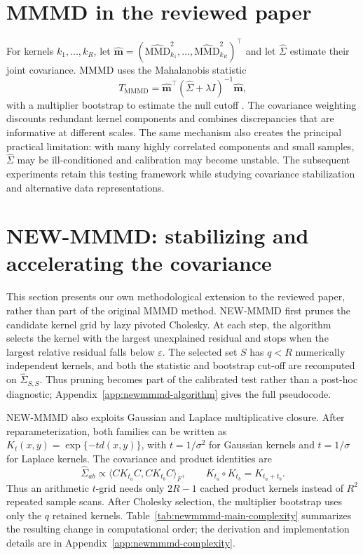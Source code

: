 \documentclass[12pt]{article}
\begin{document}
\section{MMMD in the reviewed paper}
For kernels $k_1,\ldots,k_R$, let $\widehat{\boldsymbol m}=(\widehat{\mathrm{MMD}}^2_{k_1},\ldots,\widehat{\mathrm{MMD}}^2_{k_R})^\top$ and let $\widehat\Sigma$ estimate their joint covariance. MMMD uses the Mahalanobis statistic
\[
T_{\mathrm{MMMD}}=\widehat{\boldsymbol m}^{\top}(\widehat\Sigma+\lambda I)^{-1}\widehat{\boldsymbol m},
\]
with a multiplier bootstrap to estimate the null cutoff \cite{chatterjee2025}. The covariance weighting discounts redundant kernel components and combines discrepancies that are informative at different scales. The same mechanism also creates the principal practical limitation: with many highly correlated components and small samples, $\widehat\Sigma$ may be ill-conditioned and calibration may become unstable. The subsequent experiments retain this testing framework while studying covariance stabilization and alternative data representations.
\normalsize
\endgroup
\clearpage

\section{NEW-MMMD: stabilizing and accelerating the covariance}
\label{sec:newmmmd}

This section presents our own methodological extension to the reviewed paper, rather than part of the original MMMD method. NEW-MMMD first prunes the candidate kernel grid by lazy pivoted Cholesky. At each step, the algorithm selects the kernel with the largest unexplained residual and stops when the largest relative residual falls below $\varepsilon$. The selected set $S$ has $q<R$ numerically independent kernels, and both the statistic and bootstrap cut-off are recomputed on $\widehat{\Sigma}_{S,S}$. Thus pruning becomes part of the calibrated test rather than a post-hoc diagnostic; Appendix~\ref{app:newmmmd-algorithm} gives the full pseudocode.

NEW-MMMD also exploits Gaussian and Laplace multiplicative closure. After reparameterization, both families can be written as $K_t(x,y)=\exp\{-t d(x,y)\}$, with $t=1/\sigma^2$ for Gaussian kernels and $t=1/\sigma$ for Laplace kernels. The covariance and product identities are
\[
  \widehat{\Sigma}_{ab}\propto \langle C K_{t_a} C, C K_{t_b} C\rangle_F,
  \qquad K_{t_a}\circ K_{t_b}=K_{t_a+t_b}.
\]
Thus an arithmetic $t$-grid needs only $2R-1$ cached product kernels instead of $R^2$ repeated sample scans. After Cholesky selection, the multiplier bootstrap uses only the $q$ retained kernels. Table~\ref{tab:newmmmd-main-complexity} summarizes the resulting change in computational order; the derivation and implementation details are in Appendix~\ref{app:newmmmd-complexity}.
\end{document}
